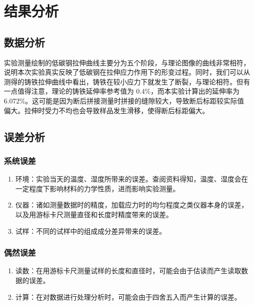 \documentclass[a4paper,utf8]{article}
\begin{document}
\section{结果分析}
\subsection{数据分析}
实验测量绘制的低碳钢拉伸曲线主要分为五个阶段，与理论图像的曲线非常相符，说明本次实验真实反映了低碳钢在拉伸应力作用下的形变过程。同时，我们可以从测得的铸铁拉伸曲线中看出，铸铁在较小应力下就发生了断裂，与理论相符。但有一点值得注意，理论的铸铁延伸率参考值为 0.4\%，而本实验计算出的延伸率为 6.072\%。这可能是因为断后拼接测量时拼接的缝隙较大，导致断后标距较实际值偏大。拉伸时受力不均也会导致样品发生滑移，使得断后标距偏大。
\subsection{误差分析}
\subsubsection{系统误差}
\begin{enumerate}
    \item 环境：实验当天的温度、湿度所带来的误差。查阅资料得知，温度、湿度会在一定程度下影响材料的力学性质，进而影响实验测量。
    \item 仪器：诸如测量数据时的精度，加载应力时的均匀程度之类仪器本身的误差，以及用游标卡尺测量直径和长度时精度带来的误差。
    \item 试样：不同的试样中的组成成分差异带来的误差。
\end{enumerate}
\subsubsection{偶然误差}
\begin{enumerate}
    \item 读数：在用游标卡尺测量试样的长度和直径时，可能会由于估读而产生读取数据的误差。
    \item 计算：在对数据进行处理分析时，可能会由于四舍五入而产生计算的误差。
\end{enumerate}
\end{document}
